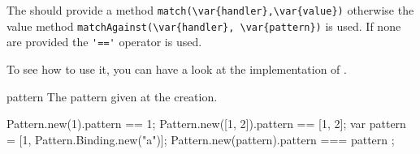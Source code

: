 \begin{urbiscriptapi}
  The  should provide a method
  \lstinline|match(\var{handler},\var{value})| otherwise the value method
  \lstinline|matchAgainst(\var{handler}, \var{pattern})| is used.  If none
  are provided the \lstinline|'=='| operator is used.

  To see how to use it, you can have a look at the implementation of
  .

\item[pattern]
  The pattern given at the creation.
\begin{urbiassert}
Pattern.new(1).pattern == 1;
Pattern.new([1, 2]).pattern == [1, 2];
{
  var pattern = [1, Pattern.Binding.new("a")];
  Pattern.new(pattern).pattern === pattern
};
\end{urbiassert}

\end{urbiscriptapi}

